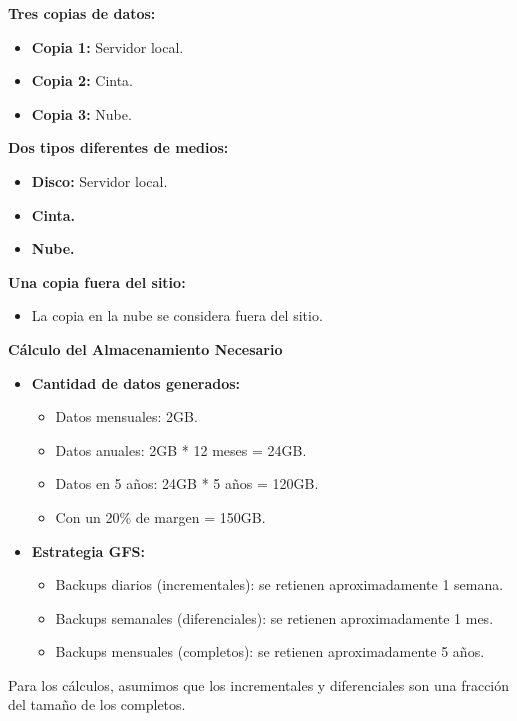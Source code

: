 \textbf{Tres copias de datos:}
\begin{itemize}
    \item \textbf{Copia 1:} Servidor local.
    \item \textbf{Copia 2:} Cinta.
    \item \textbf{Copia 3:} Nube.
\end{itemize}

\textbf{Dos tipos diferentes de medios:}
\begin{itemize}
    \item \textbf{Disco:} Servidor local.
    \item \textbf{Cinta.}
    \item \textbf{Nube.} 
\end{itemize}

\textbf{Una copia fuera del sitio:}
\begin{itemize}
    \item La copia en la nube se considera fuera del sitio.
\end{itemize}

\textbf{Cálculo del Almacenamiento Necesario}
\begin{itemize}
    \item \textbf{Cantidad de datos generados:}
    \begin{itemize}
        \item Datos mensuales: 2GB.
        \item Datos anuales: 2GB * 12 meses = 24GB.
        \item Datos en 5 años: 24GB * 5 años = 120GB.
        \item Con un 20\% de margen = 150GB.
    \end{itemize}

    \item \textbf{Estrategia GFS:}
    \begin{itemize}
        \item Backups diarios (incrementales): se retienen aproximadamente 1 semana.
        \item Backups semanales (diferenciales): se retienen aproximadamente 1 mes.
        \item Backups mensuales (completos): se retienen aproximadamente 5 años.
    \end{itemize}
\end{itemize}

Para los cálculos, asumimos que los incrementales y diferenciales son una fracción del tamaño de los completos.

